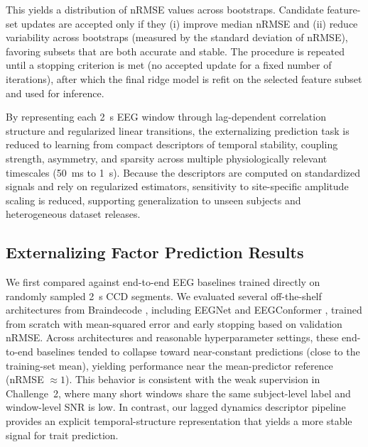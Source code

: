 \documentclass[12pt]{article}
\begin{document}
This yields a distribution of nRMSE values across bootstraps. Candidate feature-set updates are accepted only if they
(i) improve median nRMSE and (ii) reduce variability across bootstraps (measured by the standard deviation of nRMSE),
favoring subsets that are both accurate and stable. The procedure is repeated until a stopping criterion is met (no
accepted update for a fixed number of iterations), after which the final ridge model is refit on the selected feature
subset and used for inference.

By representing each 2~s EEG window through lag-dependent correlation structure and regularized linear transitions, the
externalizing prediction task is reduced to learning from compact descriptors of temporal stability, coupling strength,
asymmetry, and sparsity across multiple physiologically relevant timescales (50~ms to 1~s). Because the descriptors are
computed on standardized signals and rely on regularized estimators, sensitivity to site-specific amplitude scaling is
reduced, supporting generalization to unseen subjects and heterogeneous dataset releases.

\subsection{Externalizing Factor Prediction Results}
\label{sec:ext_results}



We first compared against end-to-end EEG baselines trained directly on randomly sampled 2~s CCD segments. We evaluated
several off-the-shelf architectures from Braindecode \citep{braindecode}, including EEGNet \citep{lawhern2018eegnet} and
EEGConformer \citep{song2023eegconformer}, trained from scratch with mean-squared error and early stopping based on
validation nRMSE. Across architectures and reasonable hyperparameter settings, these end-to-end baselines tended to
collapse toward near-constant predictions (close to the training-set mean), yielding performance near the mean-predictor
reference (nRMSE $\approx 1$). This behavior is consistent with the weak supervision in Challenge~2, where many short
windows share the same subject-level label and window-level SNR is low. In contrast, our lagged dynamics descriptor
pipeline provides an explicit temporal-structure representation that yields a more stable signal for trait prediction.
\end{document}
